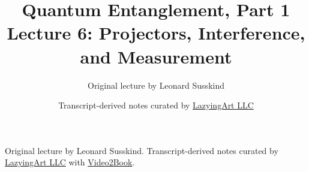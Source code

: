 \documentclass[11pt,oneside]{book}
\begin{document}
\frontmatter
\title{Quantum Entanglement, Part 1\\Lecture 6: Projectors, Interference, and Measurement}
\author{Original lecture by Leonard Susskind}
\date{Transcript-derived notes curated by \href{https://lazying.art}{LazyingArt LLC}}
\maketitle
\begin{center}
\small Original lecture by Leonard Susskind. Transcript-derived notes curated by \href{https://lazying.art}{LazyingArt LLC} with \href{https://github.com/lachlanchen/Video2Book}{Video2Book}.
\end{center}
\clearpage
\mainmatter

\end{document}
